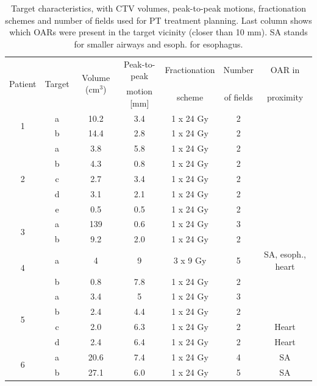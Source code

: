 \begin{table}[H]
	\centering
	\caption{Target characteristics, with CTV volumes, peak-to-peak motions, fractionation schemes and number of fields used for PT treatment planning. Last column 
	shows which OARs were present in the target vicinity (closer than 10 mm). SA stands for smaller airways and esoph. for esophagus.}
	\begin{tabular}{|c|c|c|c|c|c|c|}
		\hline\hline
		\multirow{2}{*}{Patient} & \multirow{2}{*}{Target} & \multirow{2}{*}{Volume (cm$^3$)} & Peak-to-peak & Fractionation & Number & OAR in \\
		 & & & motion [mm] & scheme & of fields & proximity \\
		\hline
		\multirow{2}{*}{1} & a & 10.2 & 3.4  & 1 x 24 Gy & 2 & \\
		 & b & 14.4 & 2.8 & 1 x 24 Gy  & 2 &  \\

		 
		 \hline
		 \multirow{5}{*}{2} & a & 3.8 & 5.8  & 1 x 24 Gy & 2 &\\
		  & b & 4.3 & 0.8  & 1 x 24 Gy& 2 &\\
		  & c & 2.7 & 3.4  & 1 x 24 Gy & 2&\\
		  & d & 3.1 & 2.1  & 1 x 24 Gy & 2&\\
		  & e & 0.5 & 0.5  & 1 x 24 Gy & 2&\\
		  \hline
		  \multirow{2}{*}{3} & a & 139 & 0.6 & 1 x 24 Gy & 3 \\
		 & b & 9.2 & 2.0  & 1 x 24 Gy & 2 \\
		 \hline
		 \multirow{2}{*}{4} & a & 4 & 9  & 3 x 9 Gy  & 5 & SA, esoph., heart \\
		 & b & 0.8 & 7.8  & 1 x 24 Gy & 2 \\
		 \hline
		 \multirow{4}{*}{5} & a & 3.4   & 5  & 1 x 24 Gy & 3 &  \\
				    & b & 2.4 & 4.4  & 1 x 24 Gy & 2 &\\
				    & c & 2.0 & 6.3  & 1 x 24 Gy& 2& Heart\\
				    & d & 2.4 & 6.4  & 1 x 24 Gy & 2 & Heart\\
		\hline	    
		\multirow{2}{*}{6} & a & 20.6 & 7.4 & 1 x 24 Gy & 4 & SA  \\
		 & b & 27.1 & 6.0  & 1 x 24 Gy &5 & SA  \\
		 

\end{tabular}
\end{table}

